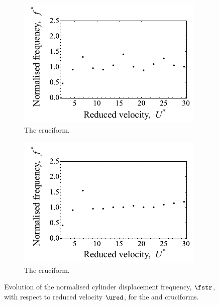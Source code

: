 \documentclass[a4paper,fleqn]{cas-sc}
\begin{document}
\begin{figure}
  \centering
  \begin{subfigure}[h]{0.4\textwidth}
    \includegraphics[width=\textwidth]{figs/yStrFreq4}
    \caption{The \angfo{} cruciform.}
    \label{fig:yStrFreq4}
  \end{subfigure}
  \hspace{6mm}
  \begin{subfigure}[h]{0.4\textwidth}
    \includegraphics[width=\textwidth]{figs/yStrFreq3}
    \caption{The \angth{} cruciform.}
    \label{fig:yStrFreq3}
  \end{subfigure}

  \caption{Evolution of the normalised cylinder displacement frequency, $\fstr$, with respect to reduced velocity $\ured$, for the \angfo{} and \angth{} cruciforms.}
  \label{fig:yStrFreq43}
\end{figure}
\end{document}

